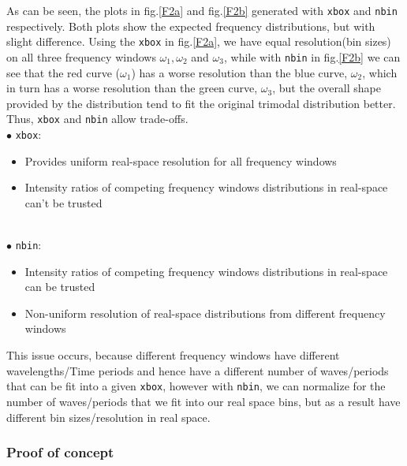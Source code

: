 \documentclass{article}
\begin{document}
As can be seen, the plots in fig.\ref{F2a} and fig.\ref{F2b} generated with \lstinline[language=R]|xbox| and \lstinline[language=R]|nbin| respectively. Both plots show the expected frequency distributions, but with slight difference. Using the \lstinline[language=R]|xbox| in fig.\ref{F2a}, we have equal resolution(bin sizes) on all three frequency windows $\omega_1, \omega_2$ and $\omega_3$, while with \lstinline[language=R]|nbin| in fig.\ref{F2b} we can see that the red curve ($\omega_1$) has a worse resolution than the blue curve, $\omega_2$, which in turn has a worse resolution than the green curve, $\omega_3$, but the overall shape provided by the distribution tend to fit the original trimodal distribution better.\\

Thus, \lstinline[language=R]|xbox| and \lstinline[language=R]|nbin| allow trade-offs.\\
$\bullet$ \lstinline[language=R]|xbox|:
\begin{itemize}
	\item Provides uniform real-space resolution for all frequency windows
	\item Intensity ratios of competing frequency windows distributions in real-space can't be trusted  
\end{itemize}
 \\
$\bullet$ \lstinline[language=R]|nbin|:
\begin{itemize}
	\item Intensity ratios of competing frequency windows distributions in real-space can be trusted
	\item Non-uniform resolution of real-space distributions from different frequency windows
\end{itemize}
This issue occurs, because different frequency windows have different wavelengths/Time periods and hence have a different number of waves/periods that can be fit into a given \lstinline[language=R]|xbox|, however with \lstinline[language=R]|nbin|, we can normalize for the number of waves/periods that we fit into our real space bins, but as a result have different bin sizes/resolution in real space.
\subsubsection{Proof of concept}
 
\end{document}
